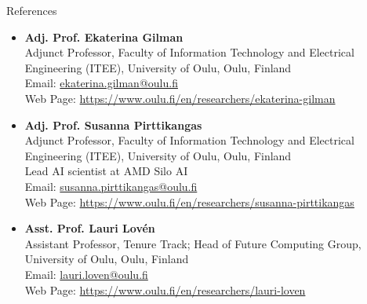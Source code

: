 \documentclass{resume}
\begin{document}

\begin{rSection}{References}
\vspace{+.1cm}

\begin{itemize}

    \item {\bf Adj. Prof. Ekaterina Gilman} \\
    Adjunct Professor, Faculty of Information Technology and Electrical Engineering (ITEE), University of Oulu, Oulu, Finland \\
    Email: \href{mailto:ekaterina.gilman@oulu.fi}{ekaterina.gilman@oulu.fi} \\
    Web Page: \href{https://www.oulu.fi/en/researchers/ekaterina-gilman}{https://www.oulu.fi/en/researchers/ekaterina-gilman}

    \item {\bf Adj. Prof. Susanna Pirttikangas} \\
    Adjunct Professor, Faculty of Information Technology and Electrical Engineering (ITEE), University of Oulu, Oulu, Finland \\
    Lead AI scientist at AMD Silo AI \\
    Email: \href{mailto:susanna.pirttikangas@oulu.fi}{susanna.pirttikangas@oulu.fi} \\
    Web Page: \href{https://www.oulu.fi/en/researchers/susanna-pirttikangas}{https://www.oulu.fi/en/researchers/susanna-pirttikangas}

    \item {\bf Asst. Prof. Lauri Lov\'en} \\
    Assistant Professor, Tenure Track; Head of Future Computing Group, University of Oulu, Oulu, Finland \\
    Email: \href{mailto:lauri.loven@oulu.fi}{lauri.loven@oulu.fi} \\
    Web Page: \href{https://www.oulu.fi/en/researchers/lauri-loven}{https://www.oulu.fi/en/researchers/lauri-loven}

\end{itemize}

\end{rSection}
\end{document}
